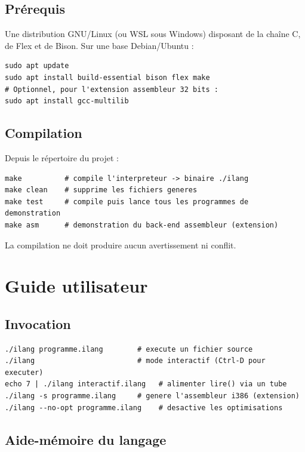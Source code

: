 \section{Prérequis}

Une distribution GNU/Linux (ou WSL sous Windows) disposant de la chaîne C, de
Flex et de Bison. Sur une base Debian/Ubuntu :

\begin{lstlisting}[style=gram]
sudo apt update
sudo apt install build-essential bison flex make
# Optionnel, pour l'extension assembleur 32 bits :
sudo apt install gcc-multilib
\end{lstlisting}

\section{Compilation}

Depuis le répertoire du projet :

\begin{lstlisting}[style=gram]
make          # compile l'interpreteur -> binaire ./ilang
make clean    # supprime les fichiers generes
make test     # compile puis lance tous les programmes de demonstration
make asm      # demonstration du back-end assembleur (extension)
\end{lstlisting}

La compilation ne doit produire aucun avertissement ni conflit.

\chapter{Guide utilisateur}
\label{annexe:guide}

\section{Invocation}

\begin{lstlisting}[style=gram]
./ilang programme.ilang        # execute un fichier source
./ilang                        # mode interactif (Ctrl-D pour executer)
echo 7 | ./ilang interactif.ilang   # alimenter lire() via un tube
./ilang -s programme.ilang     # genere l'assembleur i386 (extension)
./ilang --no-opt programme.ilang    # desactive les optimisations
\end{lstlisting}

\section{Aide-mémoire du langage}

